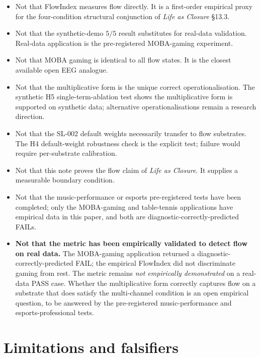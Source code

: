 \documentclass[11pt,a4paper]{article}
\begin{document}
\begin{itemize}\itemsep0pt
\item Not that FlowIndex measures flow directly. It is a first-order empirical proxy for the four-condition structural conjunction of \emph{Life as Closure} \S 13.3.
\item Not that the synthetic-demo $5/5$ result substitutes for real-data validation. Real-data application is the pre-registered MOBA-gaming experiment.
\item Not that MOBA gaming is identical to all flow states. It is the closest available open EEG analogue.
\item Not that the multiplicative form is the unique correct operationalisation. The synthetic H5 single-term-ablation test shows the multiplicative form is supported on synthetic data; alternative operationalisations remain a research direction.
\item Not that the SL-002 default weights necessarily transfer to flow substrates. The H4 default-weight robustness check is the explicit test; failure would require per-substrate calibration.
\item Not that this note proves the flow claim of \emph{Life as Closure}. It supplies a measurable boundary condition.
\item Not that the music-performance or esports pre-registered tests have been completed; only the MOBA-gaming and table-tennis applications have empirical data in this paper, and both are diagnostic-correctly-predicted FAILs.
\item \textbf{Not that the metric has been empirically validated to detect flow on real data.} The MOBA-gaming application returned a diagnostic-correctly-predicted FAIL; the empirical FlowIndex did not discriminate gaming from rest. The metric remains \emph{not empirically demonstrated} on a real-data PASS case. Whether the multiplicative form correctly captures flow on a substrate that does satisfy the multi-channel condition is an open empirical question, to be answered by the pre-registered music-performance and esports-professional tests.
\end{itemize}

\section{Limitations and falsifiers}\label{sec:limits}
\end{document}

